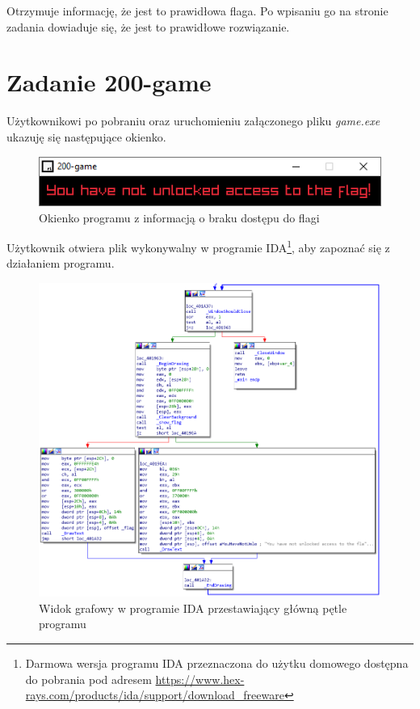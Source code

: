 \documentclass[language=polish,type=eng]{aghmodern}
\begin{document}
\begin{appendices}
Otrzymuje informację, że jest to prawidłowa flaga.
Po wpisaniu go na stronie zadania dowiaduje się, że jest to prawidłowe rozwiązanie.

\section{Zadanie 200-game}

Użytkownikowi po pobraniu oraz uruchomieniu załączonego pliku \emph{game.exe} ukazuję
się następujące okienko.

\begin{figure}[H]
\centering
\includegraphics{200_not_unlocked}
\caption{Okienko programu z informacją o braku dostępu do flagi}
\end{figure}

Użytkownik otwiera plik wykonywalny w programie IDA\footnote{
Darmowa wersja programu IDA przeznaczona do użytku domowego dostępna do pobrania pod adresem 
\url{https://www.hex-rays.com/products/ida/support/download_freeware}},
aby zapoznać się z działaniem programu.

\begin{figure}[H]
\centering
\includegraphics[width=\textwidth]{200_ida_graph}
\caption{Widok grafowy w programie IDA przestawiający główną pętle programu}
\end{figure}


\end{appendices}
\end{document}
